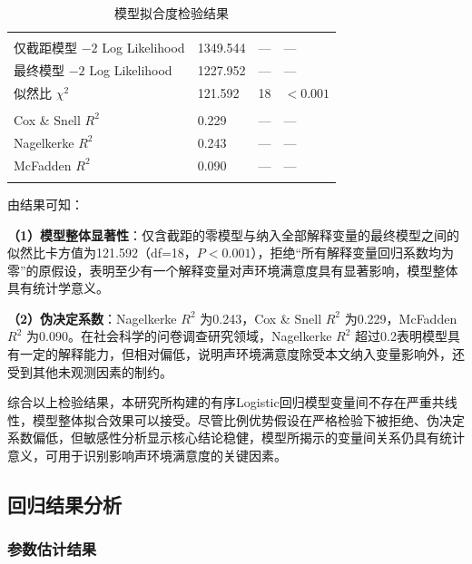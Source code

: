 \begin{table}[H]
\centering
\caption{模型拟合度检验结果}
\label{tab:gof}
\begin{tabular}{M{6.0cm}M{3.0cm}M{2.2cm}M{2.2cm}}
\bluetoprule
{}
 &  &  &  \\
\hline
{}
 \\
仅截距模型 $-2$ Log Likelihood & 1349.544 & — & — \\
最终模型 $-2$ Log Likelihood & 1227.952 & — & — \\
似然比 $\chi^2$ & 121.592 & 18 & $<0.001$ \\
 \\
Cox \& Snell $R^2$ & 0.229 & — & — \\
Nagelkerke $R^2$ & 0.243 & — & — \\
McFadden $R^2$ & 0.090 & — & — \\
\bluebottomrule
\end{tabular}
\end{table}

由结果可知：

\textbf{（1）模型整体显著性}：仅含截距的零模型与纳入全部解释变量的最终模型之间的似然比卡方值为121.592（df=18，$P<0.001$），拒绝“所有解释变量回归系数均为零”的原假设，表明至少有一个解释变量对声环境满意度具有显著影响，模型整体具有统计学意义。

\textbf{（2）伪决定系数}：Nagelkerke $R^2$ 为0.243，Cox \& Snell $R^2$ 为0.229，McFadden $R^2$ 为0.090。在社会科学的问卷调查研究领域，Nagelkerke $R^2$ 超过0.2表明模型具有一定的解释能力，但相对偏低，说明声环境满意度除受本文纳入变量影响外，还受到其他未观测因素的制约。

综合以上检验结果，本研究所构建的有序Logistic回归模型变量间不存在严重共线性，模型整体拟合效果可以接受。尽管比例优势假设在严格检验下被拒绝、伪决定系数偏低，但敏感性分析显示核心结论稳健，模型所揭示的变量间关系仍具有统计意义，可用于识别影响声环境满意度的关键因素。

\subsection{回归结果分析}

\subsubsection{参数估计结果}

